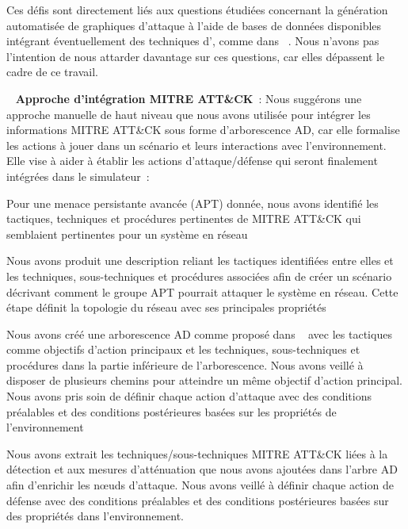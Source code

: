 Ces défis sont directement liés aux questions étudiées concernant la génération automatisée de graphiques d'attaque à l'aide de bases de données disponibles intégrant éventuellement des techniques d', comme dans ~\cite{GFalco2018}. Nous n'avons pas l'intention de nous attarder davantage sur ces questions, car elles dépassent le cadre de ce travail.

\
\noindent
\textbf{Approche d'intégration MITRE ATT\&CK}~: Nous suggérons une approche manuelle de haut niveau que nous avons utilisée pour intégrer les informations MITRE ATT\&CK sous forme d'arborescence AD, car elle formalise les actions à jouer dans un scénario et leurs interactions avec l'environnement. Elle vise à aider à établir les actions d'attaque/défense qui seront finalement intégrées dans le simulateur~:
\begin{enumerate*}[label=\arabic*),itemjoin={;\quad}]

  \item Pour une menace persistante avancée (APT) donnée, nous avons identifié les tactiques, techniques et procédures pertinentes de MITRE ATT\&CK qui semblaient pertinentes pour un système en réseau



  \item Nous avons produit une description reliant les tactiques identifiées entre elles et les techniques, sous-techniques et procédures associées afin de créer un scénario décrivant comment le groupe APT pourrait attaquer le système en réseau. Cette étape définit la topologie du réseau avec ses principales propriétés

  \item Nous avons créé une arborescence AD comme proposé dans ~\cite{BKordy2010} avec les tactiques comme objectifs d'action principaux et les techniques, sous-techniques et procédures dans la partie inférieure de l'arborescence. Nous avons veillé à disposer de plusieurs chemins pour atteindre un même objectif d'action principal. Nous avons pris soin de définir chaque action d'attaque avec des conditions préalables et des conditions postérieures basées sur les propriétés de l'environnement

  \item Nous avons extrait les techniques/sous-techniques MITRE ATT\&CK liées à la détection et aux mesures d'atténuation que nous avons ajoutées dans l'arbre AD afin d'enrichir les nœuds d'attaque. Nous avons veillé à définir chaque action de défense avec des conditions préalables et des conditions postérieures basées sur des propriétés dans l'environnement.




\end{enumerate*}
